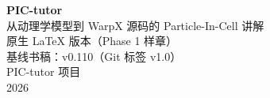 \begin{titlepage}
\centering
\vspace*{2.5cm}
{\Huge\bfseries PIC-tutor}\\[1.2cm]
{\Large 从动理学模型到 WarpX 源码的 Particle-In-Cell 讲解}\\[2.5cm]
{\large 原生 LaTeX 版本（Phase 1 样章）}\\[0.8cm]
{\normalsize 基线书稿：v0.110（Git 标签 v1.0）}\\[4cm]
{\large PIC-tutor 项目}\\[0.5cm]
{\normalsize 2026}
\vfill
\end{titlepage}
